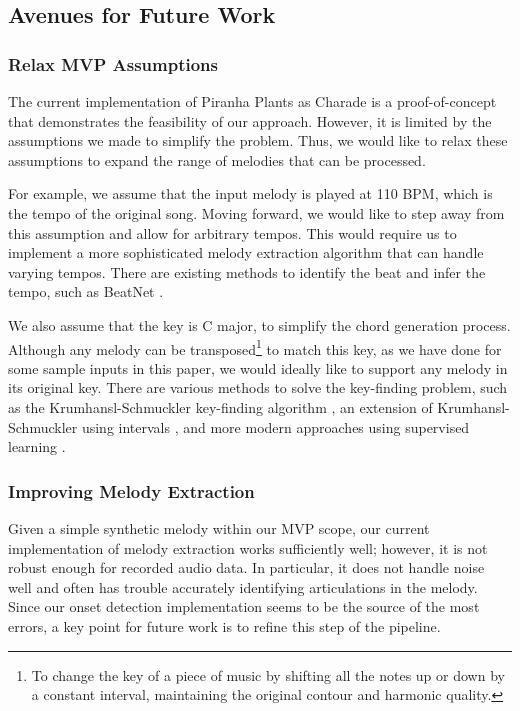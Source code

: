 \subsection{Avenues for Future Work}
\label{sec:avenues}

\subsubsection{Relax MVP Assumptions}

The current implementation of Piranha Plants as Charade is a proof-of-concept that demonstrates the feasibility of our approach. However, it is limited by the assumptions we made to simplify the problem. Thus, we would like to relax these assumptions to expand the range of melodies that can be processed.

For example, we assume that the input melody is played at 110 BPM, which is the tempo of the original song. Moving forward, we would like to step away from this assumption and allow for arbitrary tempos. This would require us to implement a more sophisticated melody extraction algorithm that can handle varying tempos. There are existing methods to identify the beat and infer the tempo, such as BeatNet \cite{BeatNet:2021}.

We also assume that the key is C major, to simplify the chord generation process. Although any melody can be transposed\footnote{To change the key of a piece of music by shifting all the notes up or down by a constant interval, maintaining the original contour and harmonic quality.} to match this key, as we have done for some sample inputs in this paper, we would ideally like to support any melody in its original key. There are various methods to solve the key-finding problem, such as the Krumhansl-Schmuckler key-finding algorithm \autocite{KrumhanslSchmuckler:1992}, an extension of Krumhansl-Schmuckler using intervals \autocite{MadsenWidmer:2007}, and more modern approaches using supervised learning \autocite{Mahieu:2016}.

\subsubsection{Improving Melody Extraction}

Given a simple synthetic melody within our MVP scope, our current implementation of melody extraction works sufficiently well; however, it is not robust enough for recorded audio data. In particular, it does not handle noise well and often has trouble accurately identifying articulations in the melody. Since our onset detection implementation seems to be the source of the most errors, a key point for future work is to refine this step of the pipeline.

